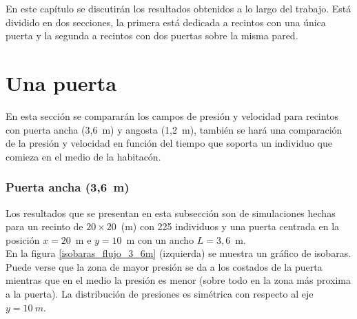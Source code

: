 En este capítulo se discutirán los resultados obtenidos a lo largo del trabajo. Está dividido en dos secciones, la primera está dedicada a recintos con una única puerta y la segunda a recintos con dos puertas sobre la misma pared.  

\section{Una puerta}

En esta sección se compararán los campos de presión y velocidad para recintos con puerta ancha (3,6~m) y angosta (1,2~m), también se hará una comparación de la presión y velocidad en función del tiempo que soporta un individuo que comieza en el medio de la habitacón.    

\subsubsection{Puerta ancha (3,6~m)}

Los resultados que se presentan en esta subsección son de simulaciones hechas para un recinto de  $20\times 20$~(m) con 225 individuos y una puerta centrada en la posición $x=20$~m e $y=10$~m con un ancho $L=3,6$~m.\\
En la figura \ref{isobaras_flujo_3_6m} (izquierda) se muestra un gráfico de isobaras. Puede verse que la zona de mayor presión se da a los costados de la puerta mientras que en el medio la presión es menor (sobre todo en la zona más proxima a la puerta). La distribución de presiones es simétrica con respecto al eje $y=10~m$. 

